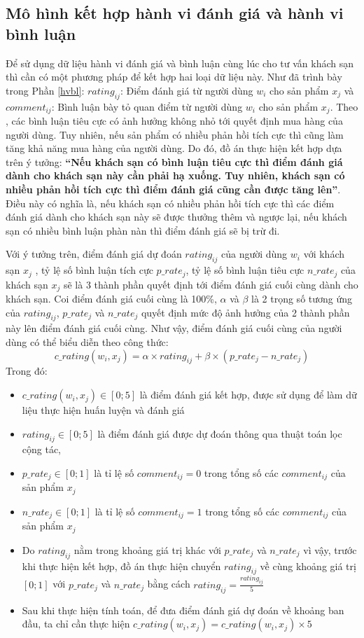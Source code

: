\subsection{Mô hình kết hợp hành vi đánh giá và hành vi bình luận}
Để sử dụng dữ liệu hành vi đánh giá và bình luận cùng lúc cho tư vấn khách sạn thì
cần có một phương pháp để kết hợp hai loại dữ liệu này. Như đã trình bày trong Phần
\ref{hvbl}: $rating_{ij}$: Điểm đánh giá từ người dùng $w_i$ cho sản phẩm $x_j$ và 
$comment_{ij}$: Bình luận bày tỏ quan điểm từ người dùng $w_i$ cho sản phẩm $x_j$.
Theo \cite{yang2022exploring}, các bình luận tiêu cực có ảnh hưởng không nhỏ tới quyết định 
mua hàng của người dùng. Tuy nhiên, nếu sản phẩm có nhiều phản hồi tích cực thì cũng làm tăng 
khả năng mua hàng của người dùng. Do đó, đồ án thực hiện kết hợp dựa trên ý tưởng:
\textbf{“Nếu khách sạn có bình luận tiêu cực thì điểm đánh giá dành cho khách sạn này cần
phải hạ xuống. Tuy nhiên, khách sạn có nhiều phản hồi tích cực thì điểm đánh giá
cũng cần được tăng lên”}. Điều này có nghĩa là, nếu khách sạn có nhiều phản hồi tích
cực thì các điểm đánh giá dành cho khách sạn này sẽ được thưởng thêm và ngược lại,
nếu khách sạn có nhiều bình luận phàn nàn thì điểm đánh giá sẽ bị trừ đi.

Với ý tưởng trên, điểm đánh giá dự đoán $rating_{ij}$ của người dùng $w_i$ với khách sạn
$x_j$ , tỷ lệ số bình luận tích cực $p\_rate_j$, tỷ lệ số bình luận tiêu cực 
$n\_rate_j$ của khách sạn $x_j$ sẽ là 3 thành phần quyết định tới điểm đánh giá cuối 
cùng dành cho  khách sạn. Coi điểm đánh giá cuối cùng là 100\%, $\alpha$ và $\beta$ là 2 trọng 
số tương ứng của $rating_{ij}$, $p\_rate_j$ và $n\_rate_j$ quyết định mức độ ảnh 
hưởng của 2 thành  phần này lên điểm đánh giá cuối cùng. Như vậy, điểm đánh giá cuối cùng 
của người dùng có thể  biểu diễn theo công thức:
\begin{equation}
    c\_rating(w_i, x_j) = \alpha \times rating_{ij} + \beta \times (p\_rate_j - n\_rate_j)
\end{equation}
Trong đó:
\begin{itemize}
    \item $c\_rating(w_i, x_j) \in [0; 5]$ là điểm đánh giá kết hợp, được sử dụng để làm dữ liệu thực
        hiện huấn luyện và đánh giá
    \item $rating_{ij} \in [0; 5]$ là điểm đánh giá được dự đoán thông qua thuật toán lọc 
        cộng tác, 
    \item $p\_rate_j \in [0; 1]$ là tỉ lệ số $comment_{ij}=0$ trong tổng số các 
        $comment_{ij}$ của sản phẩm $x_j$
    \item $n\_rate_j \in [0; 1]$ là tỉ lệ số $comment_{ij}=1$ trong tổng số các 
        $comment_{ij}$ của sản phẩm $x_j$
    \item Do $rating_{ij}$ nằm trong khoảng giá trị khác với $p\_rate_j$ và $n\_rate_j$ 
        vì vậy, trước khi thực hiện kết hợp, đồ án thực hiện chuyển $rating_{ij}$ về cùng 
        khoảng giá trị $[0;1]$ với $p\_rate_j$ và $n\_rate_j$ bằng cách 
        $rating_{ij}=\frac{rating_{ij}}{5}$
    \item Sau khi thực hiện tính toán, để đưa điểm đánh giá dự đoán về khoảng ban đầu,
        ta chỉ cần thực hiện $c\_rating(w_i, x_j) = c\_rating(w_i, x_j) \times 5$
\end{itemize}